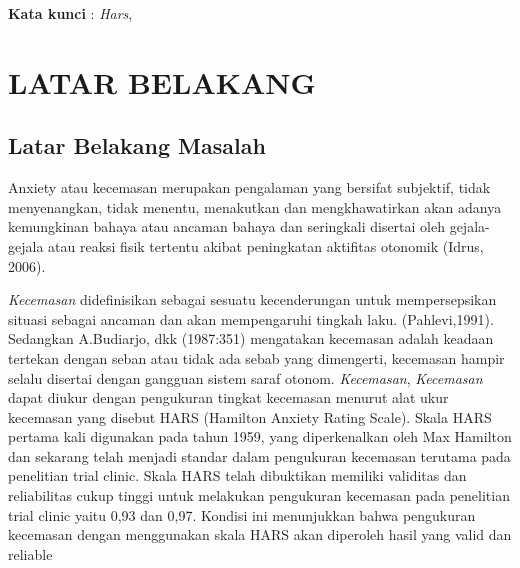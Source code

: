 \documentclass{jtetiproposalskripsi}
\begin{document}
\cover

\approvalpage


\begin{abstractind}



 


\bigskip
\textbf{Kata kunci} : \emph{Hars}, \emph{}
\end{abstractind}

\tableofcontents
{}
\clearpage{}\setcounter{page}{1}

\chapter{LATAR BELAKANG}

\section{Latar Belakang Masalah}
Anxiety atau kecemasan merupakan pengalaman yang bersifat subjektif, tidak menyenangkan, tidak menentu, menakutkan dan mengkhawatirkan akan adanya kemungkinan bahaya atau ancaman bahaya dan seringkali disertai oleh gejala-gejala atau reaksi fisik tertentu akibat peningkatan aktifitas otonomik (Idrus, 2006). 

\emph{Kecemasan} didefinisikan sebagai sesuatu kecenderungan untuk mempersepsikan situasi sebagai ancaman dan akan mempengaruhi tingkah laku. (Pahlevi,1991). Sedangkan A.Budiarjo, dkk (1987:351) mengatakan kecemasan adalah keadaan tertekan dengan seban atau tidak ada sebab yang dimengerti, kecemasan hampir selalu disertai dengan gangguan sistem saraf otonom. \emph{Kecemasan}, \emph{Kecemasan} dapat diukur dengan pengukuran tingkat kecemasan menurut alat ukur kecemasan yang disebut HARS (Hamilton Anxiety Rating Scale).  Skala HARS pertama kali digunakan pada tahun 1959, yang diperkenalkan oleh Max Hamilton dan sekarang telah menjadi standar dalam pengukuran kecemasan terutama pada penelitian trial clinic.  Skala HARS telah dibuktikan memiliki validitas dan reliabilitas cukup tinggi untuk melakukan pengukuran kecemasan pada penelitian trial clinic yaitu 0,93 dan 0,97. Kondisi ini menunjukkan bahwa pengukuran kecemasan dengan menggunakan skala HARS akan diperoleh hasil yang valid dan reliable 
\end{document}
